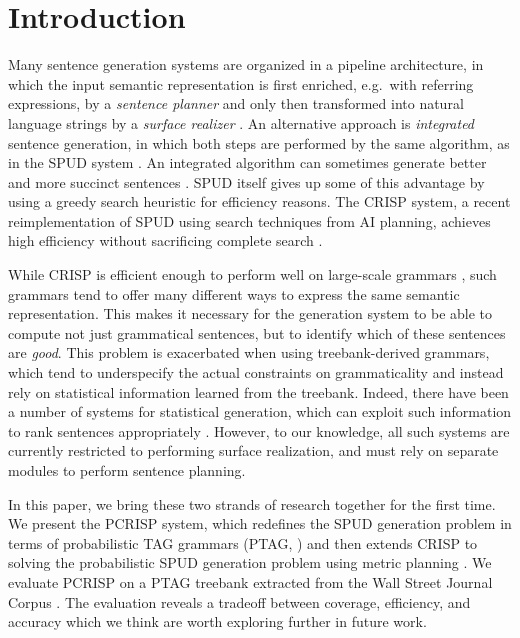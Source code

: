 \section{Introduction}

Many sentence generation systems are organized in a pipeline
architecture, in which the input semantic representation is first
enriched, e.g.\ with referring expressions, by a \emph{sentence
  planner} and only then transformed into natural language strings by
a \emph{surface realizer} \cite{reiterdale2000}.  An alternative
approach is \emph{integrated} sentence generation, in which both steps
are performed by the same algorithm, as in the SPUD system
\cite{Stone2003a}.  An integrated algorithm can sometimes generate
better and more succinct sentences \cite{stone98textual}.  SPUD itself
gives up some of this advantage by using a greedy search heuristic
for efficiency reasons.  The CRISP system, a recent reimplementation
of SPUD using search techniques from AI planning, achieves high
efficiency without sacrificing complete search
\cite{kollerstone2007,KolHof10}.

While CRISP is efficient enough to perform well on large-scale
grammars \cite{KolHof10}, such grammars tend to offer many
different ways to express the same semantic representation.  This
makes it necessary for the generation system to be able to compute not
just grammatical sentences, but to identify which of these sentences
are \emph{good}. This problem is exacerbated when using
treebank-derived grammars, which tend to underspecify the actual
constraints on grammaticality and instead rely on statistical
information learned from the treebank.  Indeed, there have been a
number of systems for statistical generation, which can exploit such
information to rank sentences appropriately
\cite{langkildeknight1998,whitebaldridge2003,belz2008}.  However, to our 
knowledge, all such systems are currently restricted to performing surface realization,
and must rely on separate modules to perform sentence planning.

In this paper, we bring these two strands of research together for the
first time.  We present the PCRISP system, which redefines the SPUD
generation problem in terms of probabilistic TAG grammars (PTAG,
\cite{resnik1992}) and then extends CRISP to solving the probabilistic
SPUD generation problem using metric planning \cite{fox2002,hoffmann2003}.  We
evaluate PCRISP on a PTAG treebank extracted from the Wall Street
Journal Corpus \cite{chenschanker2004}.  The evaluation reveals
a tradeoff between coverage, efficiency, and accuracy which we think
are worth exploring further in future work.

